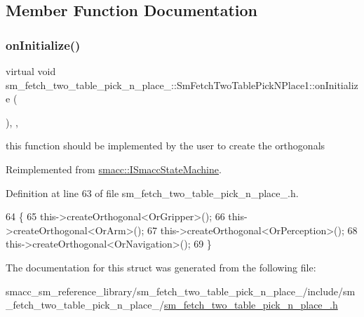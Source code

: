 \subsection{Member Function Documentation}
\mbox{\label{structsm__fetch__two__table__pick__n__place__1_1_1SmFetchTwoTablePickNPlace1_a30c707dad93553ebd88c0bb82a8586c5}} 
\subsubsection{\texorpdfstring{on\+Initialize()}{onInitialize()}}
{\footnotesize\ttfamily virtual void sm\+\_\+fetch\+\_\+two\+\_\+table\+\_\+pick\+\_\+n\+\_\+place\+\_\+::\+Sm\+Fetch\+Two\+Table\+Pick\+N\+Place1\+::on\+Initialize (\begin{DoxyParamCaption}{ }\end{DoxyParamCaption})\hspace{0.3cm}{\ttfamily [inline]}, {\ttfamily [override]}, {\ttfamily [virtual]}}



this function should be implemented by the user to create the orthogonals 



Reimplemented from \hyperlink{classsmacc_1_1ISmaccStateMachine_ac2982c6c8283663e5e1e8a7c82f511ec}{smacc\+::\+I\+Smacc\+State\+Machine}.



Definition at line 63 of file sm\+\_\+fetch\+\_\+two\+\_\+table\+\_\+pick\+\_\+n\+\_\+place\+\_.\+h.


\begin{DoxyCode}
64     \{
65         this->createOrthogonal<OrGripper>();
66         this->createOrthogonal<OrArm>();
67         this->createOrthogonal<OrPerception>();
68         this->createOrthogonal<OrNavigation>();
69     \}
\end{DoxyCode}


The documentation for this struct was generated from the following file\+:\begin{DoxyCompactItemize}
\item 
smacc\+\_\+sm\+\_\+reference\+\_\+library/sm\+\_\+fetch\+\_\+two\+\_\+table\+\_\+pick\+\_\+n\+\_\+place\+\_/include/sm\+\_\+fetch\+\_\+two\+\_\+table\+\_\+pick\+\_\+n\+\_\+place\+\_/\hyperlink{sm__fetch__two__table__pick__n__place__1_8h}{sm\+\_\+fetch\+\_\+two\+\_\+table\+\_\+pick\+\_\+n\+\_\+place\+\_.\+h}\end{DoxyCompactItemize}
